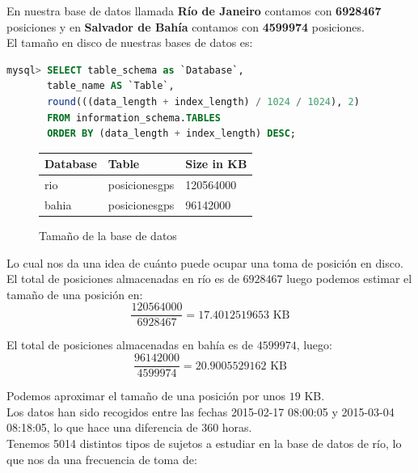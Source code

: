 \documentclass[a4paper, 12pt, spanish]{article}
\begin{document}
En nuestra base de datos llamada \textbf{R\'io de Janeiro} contamos con \textbf{6928467} posiciones y en \textbf{Salvador de Bah\'ia} contamos con \textbf{4599974} posiciones.\\

El tama\~no en disco de nuestras bases de datos es:\\

\begin{lstlisting}[language=sql, basicstyle=\small, columns=fullflexible, frame=tbrl, showstringspaces=false]
mysql> SELECT table_schema as `Database`, 
	   table_name AS `Table`,  
	   round(((data_length + index_length) / 1024 / 1024), 2) 
	   FROM information_schema.TABLES  
	   ORDER BY (data_length + index_length) DESC;

\end{lstlisting}

\begin{figure}[H]
	\centering
	\begin{tabular}{| l | l | l |}
	\hline
	\hline
	\cellcolor{LightCyan}Database & 
	\cellcolor{LightCyan}Table & 
	\cellcolor{LightCyan}Size in KB \\
	\hline
	\hline
	rio & posicionesgps & 120564000 \\
	bahia & posicionesgps & 96142000 \\
	\hline
	\end{tabular}
	\caption{Tama\~no de la base de datos}
\end{figure}

Lo cual nos da una idea de cu\'anto puede ocupar una toma de posici\'on en disco.\\

El total de posiciones almacenadas en r\'io es de $6928467$ luego podemos estimar el tama\~no de una posici\'on en: \\
$$\frac{120564000}{6928467} = 17.4012519653 \text{ KB}$$ 

El total de posiciones almacenadas en bah\'ia es de $4599974$, luego:
$$\frac{96142000}{4599974} = 20.9005529162 \text{ KB}$$

Podemos aproximar el tama\~no de una posici\'on por unos $19$ KB. \\

Los datos han sido recogidos entre las fechas 2015-02-17 08:00:05 y 2015-03-04 08:18:05, lo que hace una diferencia de 360 horas.\\

Tenemos 5014 distintos tipos de sujetos a estudiar en la base de datos de r\'io, lo que nos da una frecuencia de toma de:
\end{document}
